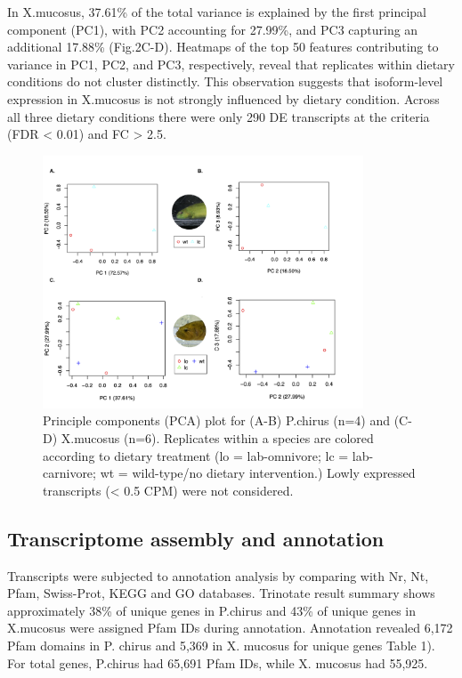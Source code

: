\documentclass[12pt,]{article}
\begin{document}
In X.mucosus, 37.61\% of the total variance is explained by the first
principal component (PC1), with PC2 accounting for 27.99\%, and PC3
capturing an additional 17.88\% (Fig.2C-D). Heatmaps of the top 50
features contributing to variance in PC1, PC2, and PC3, respectively,
reveal that replicates within dietary conditions do not cluster
distinctly. This observation suggests that isoform-level expression in
X.mucosus is not strongly influenced by dietary condition. Across all
three dietary conditions there were only 290 DE transcripts at the
criteria (FDR \textless{} 0.01) and FC \textgreater{} 2.5.

\begin{figure}[htbp]
\centering
\includegraphics[width=0.85\textwidth]{output/figures/pc_and_xm_TMM_EXPR.minRow10.log2.centered.prcomp.principal_components.png}
\caption{Principle components (PCA) plot for (A-B) P.chirus (n=4) and (C-D) X.mucosus (n=6). Replicates within a species are colored according to dietary treatment (lo = lab-omnivore; lc = lab-carnivore; wt = wild-type/no dietary intervention.) Lowly expressed transcripts (< 0.5 CPM) were not considered.}
\end{figure}

\subsection{Transcriptome assembly and
annotation}\label{transcriptome-assembly-and-annotation}

Transcripts were subjected to annotation analysis by comparing with Nr,
Nt, Pfam, Swiss-Prot, KEGG and GO databases. Trinotate result summary
shows approximately 38\% of unique genes in P.chirus and 43\% of unique
genes in X.mucosus were assigned Pfam IDs during annotation. Annotation
revealed 6,172 Pfam domains in P. chirus and 5,369 in X. mucosus for
unique genes Table 1). For total genes, P.chirus had 65,691 Pfam IDs,
while X. mucosus had 55,925.
\end{document}
